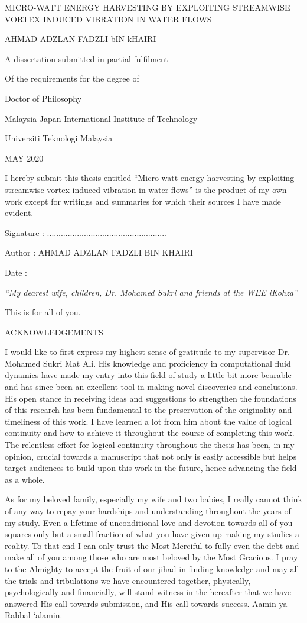 \documentclass[]{article}
\date{}
\begin{document}
MICRO-WATT ENERGY HARVESTING BY EXPLOITING STREAMWISE VORTEX INDUCED
VIBRATION IN WATER FLOWS

AHMAD ADZLAN FADZLI bIN kHAIRI

A dissertation submitted in partial fulfilment

Of the requirements for the degree of

Doctor of Philosophy

Malaysia-Japan International Institute of Technology

Universiti Teknologi Malaysia

MAY 2020

I hereby submit this thesis entitled ``Micro-watt energy harvesting by
exploiting streamwise vortex-induced vibration in water flows'' is the
product of my own work except for writings and summaries for which their
sources I have made evident.

Signature : ....................................................

Author : AHMAD ADZLAN FADZLI BIN KHAIRI

Date :

\emph{``My dearest wife, children, Dr. Mohamed Sukri and friends at the
WEE iKohza''}

This is for all of you.

\protect\hypertarget{_Toc41048784}{}{}ACKNOWLEDGEMENTS

I would like to first express my highest sense of gratitude to my
supervisor Dr. Mohamed Sukri Mat Ali. His knowledge and proficiency in
computational fluid dynamics have made my entry into this field of study
a little bit more bearable and has since been an excellent tool in
making novel discoveries and conclusions. His open stance in receiving
ideas and suggestions to strengthen the foundations of this research has
been fundamental to the preservation of the originality and timeliness
of this work. I have learned a lot from him about the value of logical
continuity and how to achieve it throughout the course of completing
this work. The relentless effort for logical continuity throughout the
thesis has been, in my opinion, crucial towards a manuscript that not
only is easily accessible but helps target audiences to build upon this
work in the future, hence advancing the field as a whole.

As for my beloved family, especially my wife and two babies, I really
cannot think of any way to repay your hardships and understanding
throughout the years of my study. Even a lifetime of unconditional love
and devotion towards all of you squares only but a small fraction of
what you have given up making my studies a reality. To that end I can
only trust the Most Merciful to fully even the debt and make all of you
among those who are most beloved by the Most Gracious. I pray to the
Almighty to accept the fruit of our jihad in finding knowledge and may
all the trials and tribulations we have encountered together,
physically, psychologically and financially, will stand witness in the
hereafter that we have answered His call towards submission, and His
call towards success. Aamin ya Rabbal `alamin.
\end{document}
